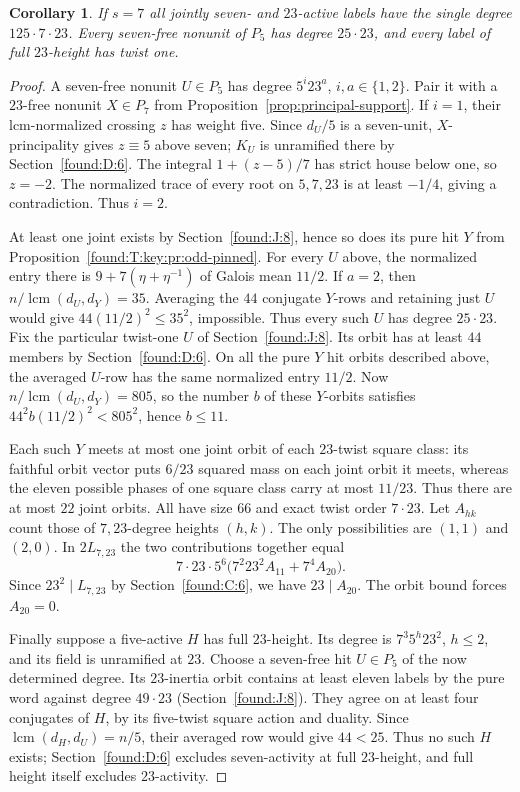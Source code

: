 \documentclass[11pt,a4paper]{article}
\numberwithin{equation}{section}
\newtheorem{corollary}[theorem]{Corollary}
\theoremstyle{remark}
\begin{document}
\begin{corollary}\label{found:T:10.4}\label{found:T:key:cor:odd-one-degree}
If $s=7$ all jointly seven- and $23$-active labels have the single
degree $125\cdot7\cdot23$. Every seven-free nonunit of $P_5$ has
degree $25\cdot23$, and every label of full $23$-height has twist one.
\end{corollary}
\begin{proof}
A seven-free nonunit $U\in P_5$ has degree $5^i23^a$, $i,a\in\{1,2\}$.
Pair it with a $23$-free nonunit $X\in P_7$ from Proposition~\ref{prop:principal-support}.
If $i=1$, their lcm-normalized crossing $z$ has weight five.
Since $d_U/5$ is a seven-unit, $X$-principality gives $z\equiv5$
above seven; $K_U$ is unramified there by Section~\ref{found:D:6}. The integral
$1+(z-5)/7$ has strict house below one, so $z=-2$. The normalized
trace of every root on $5,7,23$ is at least $-1/4$, giving a
contradiction. Thus $i=2$.

At least one joint exists by Section~\ref{found:J:8}, hence so does its
pure hit $Y$ from Proposition~\ref{found:T:key:pr:odd-pinned}. For every $U$
above, the normalized entry there is $9+7(\eta+\eta^{-1})$ of
Galois mean $11/2$. If $a=2$, then
$n/\operatorname{lcm}(d_U,d_Y)=35$.
Averaging the $44$ conjugate $Y$-rows and retaining just $U$ would
give $44(11/2)^2\le35^2$, impossible. Thus every such $U$ has
degree $25\cdot23$. Fix the particular twist-one $U$ of Section~\ref{found:J:8}. Its orbit has at least $44$ members by Section~\ref{found:D:6}.
On all the pure $Y$ hit orbits described above, the averaged
$U$-row has the same normalized entry $11/2$. Now
$n/\operatorname{lcm}(d_U,d_Y)=805$, so the number $b$ of these
$Y$-orbits satisfies $44^2 b(11/2)^2<805^2$, hence $b\le11$.

Each such $Y$ meets at most one joint orbit of each $23$-twist
square class: its faithful orbit vector puts $6/23$ squared mass
on each joint orbit it meets, whereas the eleven possible phases
of one square class carry at most $11/23$. Thus there are at most
$22$ joint orbits. All have size $66$ and exact twist order
$7\cdot23$. Let $A_{hk}$ count those of $7,23$-degree heights
$(h,k)$. The only possibilities are $(1,1)$ and $(2,0)$. In
$2L_{7,23}$ the two contributions together equal
\[
  7\cdot23\cdot5^6
  \bigl(7^2 23^2 A_{11}+7^4 A_{20}\bigr).
\]
Since $23^2\mid L_{7,23}$ by Section~\ref{found:C:6}, we have
$23\mid A_{20}$. The orbit bound forces $A_{20}=0$.

Finally suppose a five-active $H$ has full $23$-height. Its degree
is $7^3 5^h23^2$, $h\le2$, and its field is unramified at $23$.
Choose a seven-free hit $U\in P_5$ of the now determined degree.
Its $23$-inertia orbit contains at least eleven labels by the pure word against degree $49\cdot23$ (Section~\ref{found:J:8}). They agree
on at least four conjugates of $H$, by its five-twist square action
and duality. Since $\operatorname{lcm}(d_H,d_U)=n/5$, their
averaged row would give $44<25$. Thus no such $H$ exists; Section~\ref{found:D:6} excludes seven-activity at full $23$-height, and full
height itself excludes $23$-activity.
\end{proof}
\end{document}
